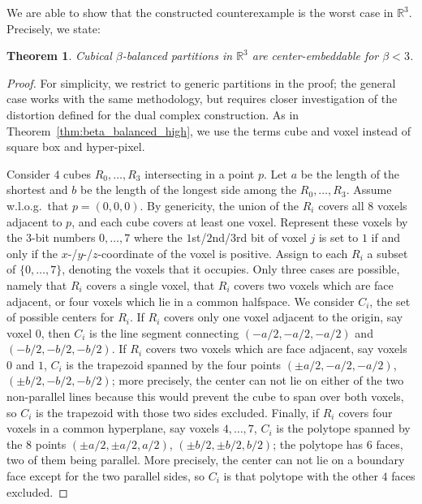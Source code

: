 \documentclass[12pt]{article}
\newcommand{\R}{\mathbb{R}}
\newtheorem{theorem}{Theorem}
\begin{document}
We are able to show that the constructed counterexample is the worst case
in $\R^3$. Precisely, we state:

\begin{theorem}\label{thm:cubical_partition_bound_3d}
Cubical $\beta$-balanced partitions in $\R^3$ 
are center-embeddable for $\beta<3$.
\end{theorem}
\begin{proof}
For simplicity, we restrict to generic partitions in the proof; the 
general case works with the same methodology, but requires closer
investigation of the distortion defined for the dual complex construction.
As in Theorem~\ref{thm:beta_balanced_high}, 
we use the terms cube and voxel instead of square box and hyper-pixel.

Consider $4$ cubes $R_0,\ldots,R_3$ intersecting in a point $p$.
Let $a$ be the length of the shortest and $b$ be the length of the longest
side among the $R_0,\ldots,R_3$. 
Assume w.l.o.g.\ that $p=(0,0,0)$. By genericity, the union of the $R_i$ covers all
$8$ voxels adjacent to $p$, and each cube covers at least one voxel.
Represent these voxels by the 3-bit numbers $0,\ldots,7$ where the 
$1$st/$2$nd/$3$rd bit of voxel $j$ is set to $1$ if and only if the 
$x$-/$y$-/$z$-coordinate of the voxel is positive. 
Assign to each $R_i$ a subset of
$\{0,\ldots,7\}$, denoting the voxels that it occupies.
Only three cases are possible, namely that $R_i$
covers a single voxel, that $R_i$ covers two voxels which are face adjacent,
or four voxels which lie in a common halfspace.
We consider $C_i$, the set of possible centers for $R_i$.
If $R_i$ covers only one voxel
adjacent to the origin, say voxel $0$, then $C_i$
is the line segment connecting $(-a/2,-a/2,-a/2)$
and $(-b/2,-b/2,-b/2)$. If $R_i$ covers two voxels which are face adjacent,
say voxels $0$ and $1$, $C_i$ is the trapezoid
spanned by the four points $(\pm a/2,-a/2,-a/2)$, $(\pm b/2,-b/2,-b/2)$; 
more precisely, the center can not
lie on either of the two non-parallel lines because this would prevent
the cube to span over both voxels, so $C_i$ is the trapezoid with those
two sides excluded.
Finally, if $R_i$ covers four voxels in a common hyperplane, say
voxels $4,\ldots,7$, $C_i$ is the polytope spanned by
the $8$ points $(\pm a/2, \pm a/2,a/2)$, $(\pm b/2, \pm b/2, b/2)$;
the polytope has 6 faces, two
of them being parallel.
More precisely, the center can not lie on a boundary face except for the
two parallel sides, so $C_i$ is that polytope with 
the other $4$ faces excluded.


\end{proof}
\end{document}
